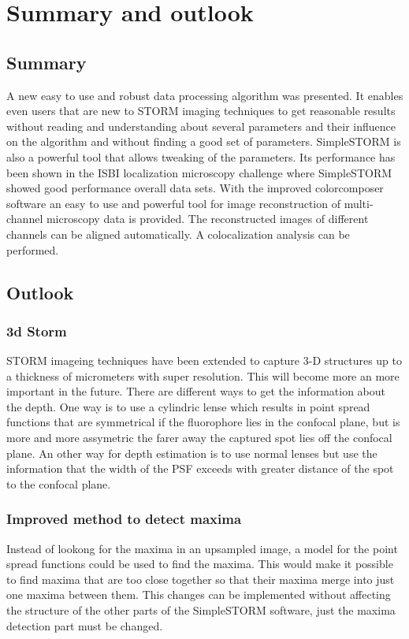 \chapter{Summary and outlook}
\section{Summary}
A new easy to use and robust data processing algorithm was presented. It enables even users that are new to STORM imaging techniques to get reasonable results without reading and understanding about several parameters and their influence on the algorithm and without finding a good set of parameters.\newline
SimpleSTORM is also a powerful tool that allows tweaking of the parameters. Its performance has been shown in the ISBI localization microscopy challenge where SimpleSTORM showed good performance overall data sets.\newline
With the improved colorcomposer software an easy to use and powerful tool for image reconstruction of multi-channel microscopy data is provided. The reconstructed images of different channels can be aligned automatically. A colocalization analysis can be performed.
\section{Outlook}
\subsection{3d Storm}
STORM imageing techniques have been extended to capture 3-D structures up to a thickness of micrometers with super resolution. This will become more an more important in the future. There are different ways to get the information about the depth. One way is to use a cylindric lense which results in point spread functions that are symmetrical if the fluorophore lies in the confocal plane, but is more and more assymetric the farer away the captured spot lies off the confocal plane.\newline
An other way for depth estimation is to use normal lenses but use the information that the width of the PSF exceeds with greater distance of the spot to the confocal plane.
\subsection{Improved method to detect maxima}
Instead of lookong for the maxima in an upsampled image, a model for the point spread functions could be used to find the maxima. This would make it possible to find maxima that are too close together so that their maxima merge into just one maxima between them.\newline
This changes can be implemented without affecting the structure of the other parts of the SimpleSTORM software, just the maxima detection part must be changed.

